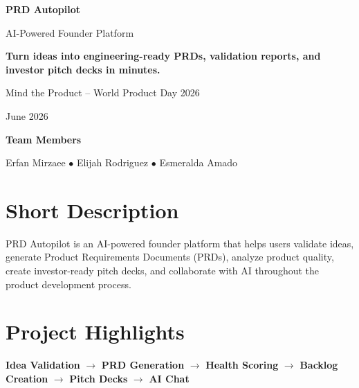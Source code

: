 \documentclass[11pt]{article}
\begin{document}
\begin{titlepage}
    \centering
    \vspace*{2cm}

    {\Huge\bfseries PRD Autopilot\par}
    \vspace{0.5cm}
    {\Large\color{primary} AI-Powered Founder Platform\par}

    \vspace{1cm}

    \begin{tcolorbox}[
        colback=light,
        colframe=primary,
        width=0.85\textwidth,
        arc=4mm,
        boxrule=0.8pt
    ]
    \centering
    \textbf{Turn ideas into engineering-ready PRDs, validation reports, and investor pitch decks in minutes.}
    \end{tcolorbox}

    \vspace{1.5cm}

    {\large Mind the Product -- World Product Day 2026\par}
    \vspace{0.3cm}
    {\large June 2026\par}

    \vfill

    {\large\bfseries Team Members\par}
    \vspace{0.3cm}
    Erfan Mirzaee \quad $\bullet$ \quad Elijah Rodriguez \quad $\bullet$ \quad Esmeralda Amado

    \vspace{1cm}
\end{titlepage}

\section{Short Description}

PRD Autopilot is an AI-powered founder platform that helps users validate ideas, generate Product Requirements Documents (PRDs), analyze product quality, create investor-ready pitch decks, and collaborate with AI throughout the product development process.

\section{Project Highlights}

\begin{tcolorbox}[
    colback=light,
    colframe=secondary,
    arc=3mm,
    boxrule=0.8pt
]
\centering
\textbf{Idea Validation}
$\rightarrow$
\textbf{PRD Generation}
$\rightarrow$
\textbf{Health Scoring}
$\rightarrow$
\textbf{Backlog Creation}
$\rightarrow$
\textbf{Pitch Decks}
$\rightarrow$
\textbf{AI Chat}
\end{tcolorbox}
\end{document}
